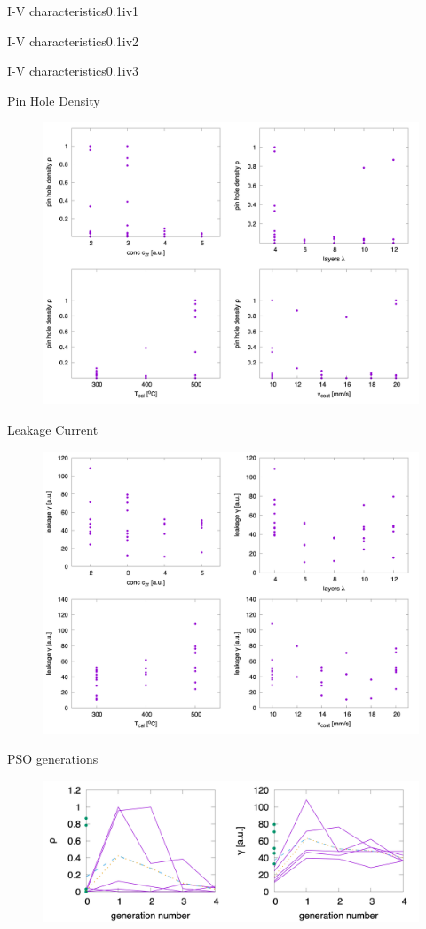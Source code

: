 \documentclass[hyperref={pdfpagelabels=false}, aspectratio=43, t]{beamer}  %
\begin{document}
\begin{graphicsFrame}{I-V characteristics}{}{0.1}{}{iv1}{}\end{graphicsFrame}
\begin{graphicsFrame}{I-V characteristics}{}{0.1}{}{iv2}{}\end{graphicsFrame}
\begin{graphicsFrame}{I-V characteristics}{}{0.1}{}{iv3}{}\end{graphicsFrame}
\begin{frame}{Pin Hole Density}\begin{figure}\includegraphics[width=.66\textwidth]{figures/phd.png}\end{figure}\end{frame}
\begin{frame}{Leakage Current}\begin{figure}\includegraphics[width=.66\textwidth]{figures/leakage.png}\end{figure}\end{frame}
\begin{frame}{PSO generations}\begin{figure}\includegraphics[width=.96\textwidth]{figures/emma-gen.png}\end{figure}\end{frame}
\end{document}
